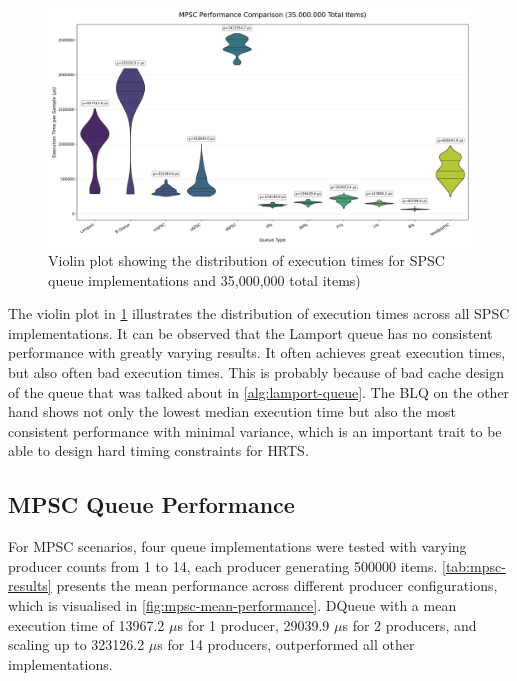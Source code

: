 \begin{figure}[htb]
\centering
\caption{Violin plot showing the distribution of execution times for \ac{SPSC} queue implementations and 35,000,000 total items)}
\label{fig:spsc-violin}
\includegraphics[width=\textwidth]{images/results/spsc_queue_performance_violin_test.png}
\end{figure}

The violin plot in \cref{fig:spsc-violin} illustrates the distribution of execution times across all SPSC implementations. It can be observed that the Lamport queue has no consistent performance with greatly varying results. It often achieves great execution times, but also often bad execution times. This is probably because of bad cache design of the queue that was talked about in \cref{alg:lamport-queue}. The \ac{BLQ} on the other hand shows not only the lowest median execution time but also the most consistent performance with minimal variance, which is an important trait to be able to design hard timing constraints for \ac{HRTS}. 

\subsection{\acf{MPSC} Queue Performance}
For \ac{MPSC} scenarios, four queue implementations were tested with varying producer counts from 1 to 14, each producer generating 500000 items. \cref{tab:mpsc-results} presents the mean performance across different producer configurations, which is visualised in \cref{fig:mpsc-mean-performance}. DQueue with a mean execution time of 13967.2 $\mu$s for 1 producer, 29039.9 $\mu$s for 2 producers, and scaling up to 323126.2 $\mu$s for 14 producers, outperformed all other implementations.

